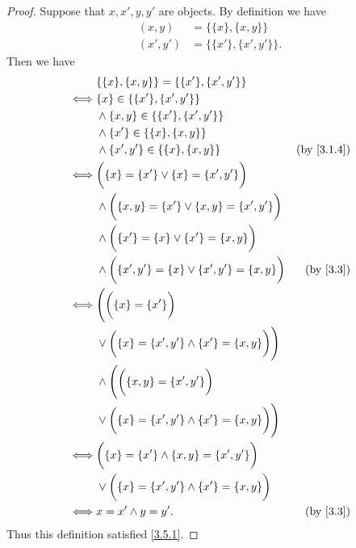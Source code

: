 \begin{proof}
  Suppose that \(x, x', y, y'\) are objects.
  By definition we have
  \begin{align*}
    (x, y)   & = \{\{x\}, \{x, y\}\}     \\
    (x', y') & = \{\{x'\}, \{x', y'\}\}.
  \end{align*}
  Then we have
  \begin{align*}
         & \{\{x\}, \{x, y\}\} = \{\{x'\}, \{x', y'\}\}                                                 \\
    \iff & \{x\} \in \{\{x'\}, \{x', y'\}\}                                                             \\
         & \land \{x, y\} \in \{\{x'\}, \{x', y'\}\}                                                    \\
         & \land \{x'\} \in \{\{x\}, \{x, y\}\}                                                         \\
         & \land \{x', y'\} \in \{\{x\}, \{x, y\}\}                          & \text{(by \cref{3.1.4})} \\
    \iff & \bigg(\{x\} = \{x'\} \lor \{x\} = \{x', y'\}\bigg)                                           \\
         & \land \bigg(\{x, y\} = \{x'\} \lor \{x, y\} = \{x', y'\}\bigg)                               \\
         & \land \bigg(\{x'\} = \{x\} \lor \{x'\} = \{x, y\}\bigg)                                      \\
         & \land \bigg(\{x', y'\} = \{x\} \lor \{x', y'\} = \{x, y\}\bigg)   & \text{(by \cref{3.3})}   \\
    \iff & \Bigg(\bigg(\{x\} = \{x'\}\bigg)                                                             \\
         & \lor \bigg(\{x\} = \{x', y'\} \land \{x'\} = \{x, y\}\bigg)\Bigg)                            \\
         & \land \Bigg(\bigg(\{x, y\} = \{x', y'\}\bigg)                                                \\
         & \lor \bigg(\{x\} = \{x', y'\} \land \{x'\} = \{x, y\}\bigg)\Bigg)                            \\
    \iff & \bigg(\{x\} = \{x'\} \land \{x, y\} = \{x', y'\}\bigg)                                       \\
         & \lor \bigg(\{x\} = \{x', y'\} \land \{x'\} = \{x, y\}\bigg)                                  \\
    \iff & x = x' \land y = y'.                                              & \text{(by \cref{3.3})}
  \end{align*}
  Thus this definition satisfied \cref{3.5.1}.


\end{proof}
